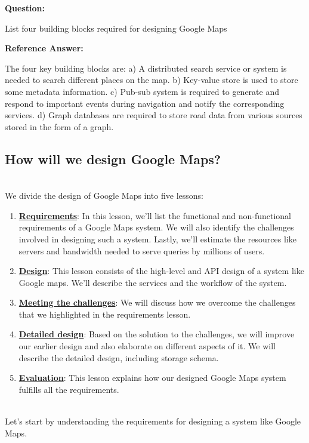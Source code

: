 \textbf{Question:}

List four building blocks required for designing Google Maps

\textbf{Reference Answer:}

The four key building blocks are: a) A distributed search service or system is needed to search different places on the map. b) Key-value store is used to store some metadata information. c) Pub-sub system is required to generate and respond to important events during navigation and notify the corresponding services. d) Graph databases are required to store road data from various sources stored in the form of a graph.

\subsection{How will we design Google Maps?}\label{PsrS7zolbIUQ-d8LXNCd9}
\\
We divide the design of Google Maps into five lessons:

\begin{enumerate}
\item
\protect{}\label{4JAKg9v0ThcXqYY0ImLZk}
\href{https://www.educative.io/courses/grokking-the-system-design-interview/requirements-of-google-maps-design}{\textbf{Requirements}}: In this lesson, we'll list the functional and non-functional requirements of a Google Maps system. We will also identify the challenges involved in designing such a system. Lastly, we'll estimate the resources like servers and bandwidth needed to serve queries by millions of users.
\item
\protect{}\label{dAF3Zxm456qOI_MsAZ8KD}
\href{https://www.educative.io/courses/grokking-the-system-design-interview/design-of-google-maps}{\textbf{Design}}: This lesson consists of the high-level and API design of a system like Google maps. We'll describe the services and the workflow of the system.
\item
\protect{}\label{LJXk-ehHovE5YypoTaFxp}
\href{https://www.educative.io/courses/grokking-the-system-design-interview/challenges-of-google-maps-design}{\textbf{Meeting the challenges}}: We will discuss how we overcome the challenges that we highlighted in the requirements lesson.
\item
\protect{}\label{pyCWJ7kEAUrmX46lJHlRu}
\href{https://www.educative.io/courses/grokking-the-system-design-interview/detailed-design-of-google-maps}{\textbf{Detailed design}}: Based on the solution to the challenges, we will improve our earlier design and also elaborate on different aspects of it. We will describe the detailed design, including storage schema.
\item
\protect{}\label{rV50GnXU1omrCTKjo9_V6}
\href{https://www.educative.io/courses/grokking-the-system-design-interview/evaluation-of-google-maps-design}{\textbf{Evaluation}}: This lesson explains how our designed Google Maps system fulfills all the requirements.
\end{enumerate}
\\
Let's start by understanding the requirements for designing a system like Google Maps.

